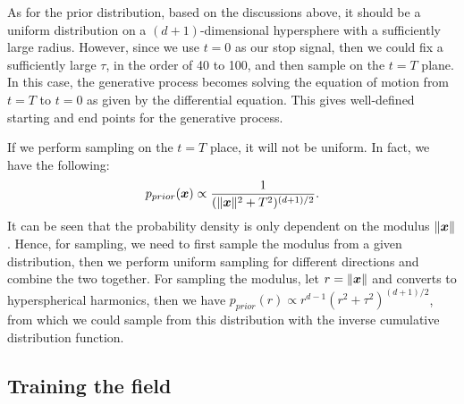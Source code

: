 As for the prior distribution, based on the discussions above, it should be a uniform distribution on a $(d+1)$-dimensional hypersphere with a sufficiently large radius. However, since we use $t=0$ as our stop signal, then we could fix a sufficiently large $\tau$, in the order of 40 to 100, and then sample on the $t=T$ plane. In this case, the generative process becomes solving the equation of motion from $t=T$ to $t=0$ as given by the differential equation. This gives well-defined starting and end points for the generative process.

If we perform sampling on the $t=T$ place, it will not be uniform. In fact, we have the following:
\begin{equation}
    p_{prior}(\bm{x})\propto\frac{1}{(\|\bm{x}\|^2+T^2)^{(d+1)/2}}.
\end{equation}
It can be seen that the probability density is only dependent on the modulus $\|\bm{x}\|$. Hence, for sampling, we need to first sample the modulus from a given distribution, then we perform uniform sampling for different directions and combine the two together. For sampling the modulus, let $r=\|\bm{x}\|$ and converts to hyperspherical harmonics, then we have $p_{prior}(r)\propto r^{d-1}(r^2+\tau^2)^{(d+1)/2}$, from which we could sample from this distribution with the inverse cumulative distribution function.

\subsection{Training the field}

